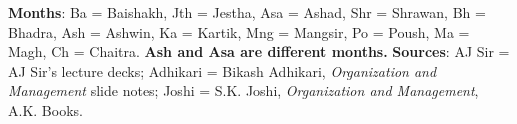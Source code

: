 \vspace{4pt}
{\color{sub}\footnotesize \textbf{Months}: Ba = Baishakh, Jth = Jestha, Asa = Ashad, Shr =
Shrawan, Bh = Bhadra, Ash = Ashwin, Ka = Kartik, Mng = Mangsir, Po = Poush, Ma = Magh,
Ch = Chaitra. \textbf{Ash and Asa are different months.}
\textbf{Sources}: AJ Sir = AJ Sir's lecture decks; Adhikari = Bikash Adhikari, \textit{Organization
and Management} slide notes; Joshi = S.K. Joshi, \textit{Organization and Management},
A.K. Books.}
